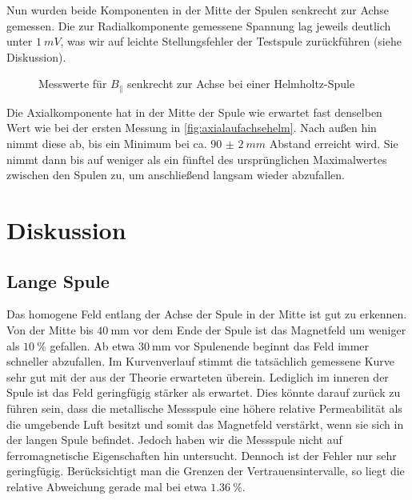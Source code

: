Nun wurden beide Komponenten in der Mitte der Spulen senkrecht zur Achse gemessen. Die zur Radialkomponente gemessene Spannung lag jeweils deutlich unter $\SI{1}{mV}$, was wir auf leichte Stellungsfehler der Testspule zurückführen (siehe Diskussion).
\begin{figure}[H]
\centering
{}
\caption{Messwerte für $B_\parallel$ senkrecht zur Achse bei einer Helmholtz-Spule}
\label{fig:axialsenkrechthelm}
\end{figure}
Die Axialkomponente hat in der Mitte der Spule wie erwartet fast denselben Wert wie bei der ersten Messung in \cref{fig:axialaufachsehelm}. Nach außen hin nimmt diese ab, bis ein Minimum bei ca. $\SI{90(2)}{mm}$ Abstand erreicht wird. Sie nimmt dann bis auf weniger als ein fünftel des ursprünglichen Maximalwertes zwischen den Spulen zu, um anschließend langsam wieder abzufallen.
\section{Diskussion}
\subsection{Lange Spule}
Das homogene Feld entlang der Achse der Spule in der Mitte ist gut zu erkennen. Von der Mitte bis $ \SI{40}{\milli\meter} $ vor dem Ende der Spule ist das Magnetfeld um weniger als $ \SI{10}{\percent} $ gefallen. Ab etwa $ \SI{30}{\milli\meter} $ vor Spulenende beginnt das Feld immer schneller abzufallen. Im Kurvenverlauf stimmt die tatsächlich gemessene Kurve sehr gut mit der aus der Theorie erwarteten überein. Lediglich im inneren der Spule ist das Feld geringfügig stärker als erwartet. Dies könnte darauf zurück zu führen sein, dass die metallische Messspule eine höhere relative Permeabilität als die umgebende Luft besitzt und somit das Magnetfeld verstärkt, wenn sie sich in der langen Spule befindet. Jedoch haben wir die Messspule nicht auf ferromagnetische Eigenschaften hin untersucht. Dennoch ist der Fehler nur sehr geringfügig. Berücksichtigt man die Grenzen der Vertrauensintervalle, so liegt die relative Abweichung gerade mal bei etwa $ \SI{1.36}{\percent} $.


